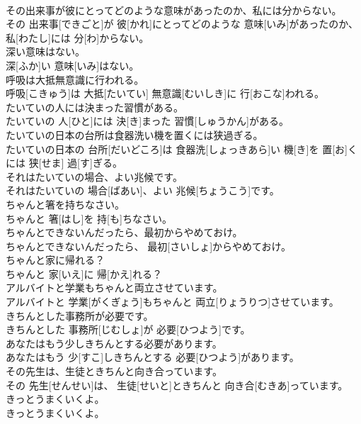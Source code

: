 \documentclass[8pt]{extreport}
\begin{document}
\begin{CJK}{UTF8}{min}
\\	その出来事が彼にとってどのような意味があったのか、私には分からない。	
\\	その 出来事[できごと]が 彼[かれ]にとってどのような 意味[いみ]があったのか、 私[わたし]には 分[わ]からない。	
\\	深い意味はない。	
\\	深[ふか]い 意味[いみ]はない。	
\\	呼吸は大抵無意識に行われる。	
\\	呼吸[こきゅう]は 大抵[たいてい] 無意識[むいしき]に 行[おこな]われる。	
\\	たいていの人には決まった習慣がある。	
\\	たいていの 人[ひと]には 決[き]まった 習慣[しゅうかん]がある。	
\\	たいていの日本の台所は食器洗い機を置くには狭過ぎる。	
\\	たいていの日本の 台所[だいどころ]は 食器洗[しょっきあら]い 機[き]を 置[お]くには 狭[せま] 過[す]ぎる。	
\\	それはたいていの場合、よい兆候です。	
\\	それはたいていの 場合[ばあい]、よい 兆候[ちょうこう]です。	
\\	ちゃんと箸を持ちなさい。	
\\	ちゃんと 箸[はし]を 持[も]ちなさい。	
\\	ちゃんとできないんだったら、最初からやめておけ。	
\\	ちゃんとできないんだったら、 最初[さいしょ]からやめておけ。	
\\	ちゃんと家に帰れる？	
\\	ちゃんと 家[いえ]に 帰[かえ]れる？	
\\	アルバイトと学業もちゃんと両立させています。	
\\	アルバイトと 学業[がくぎょう]もちゃんと 両立[りょうりつ]させています。	
\\	きちんとした事務所が必要です。	
\\	きちんとした 事務所[じむしょ]が 必要[ひつよう]です。	
\\	あなたはもう少しきちんとする必要があります。	
\\	あなたはもう 少[すこ]しきちんとする 必要[ひつよう]があります。	
\\	その先生は、生徒ときちんと向き合っています。	
\\	その 先生[せんせい]は、 生徒[せいと]ときちんと 向き合[むきあ]っています。	
\\	きっとうまくいくよ。	
\\	きっとうまくいくよ。	

\end{CJK}
\end{document}
